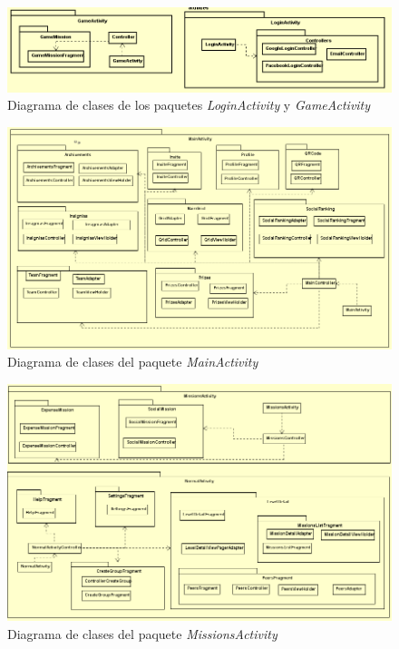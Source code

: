 \documentclass[twoside]{report}
\begin{document}
\begin{figure}[H]
\centering
\includegraphics[scale=0.7]{images/structureloginGameModel.PNG}
\caption{Diagrama de clases de los paquetes \textit{LoginActivity} y \textit{GameActivity}}
\end{figure}

\begin{figure}[H]
\centering
\includegraphics[scale=0.6]{images/structureMainActivity}
\caption{Diagrama de clases del paquete \textit{MainActivity}}
\end{figure}

\begin{figure}[H]
\centering
\includegraphics[scale=0.7]{images/structureMissions}
\caption{Diagrama de clases del paquete \textit{MissionsActivity}}
\end{figure}
\end{document}
